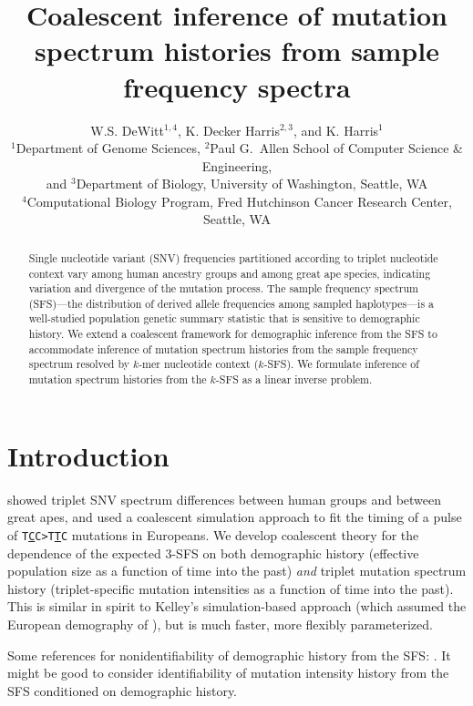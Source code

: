 \documentclass[11pt]{article}
\title{Coalescent inference of mutation spectrum histories from sample frequency spectra}
\author{
W.S. DeWitt$^{1,4}$, K. Decker Harris$^{2,3}$, and K. Harris$^{1}$\\
{\small
$^1$Department of Genome Sciences,
$^2$Paul G.\ Allen School of Computer Science \& Engineering,}\\
{\small and $^3$Department of Biology, University of Washington, Seattle, WA}\\
{\small $^4$Computational Biology Program, Fred Hutchinson Cancer Research Center, Seattle, WA}
}
\begin{document}
\maketitle

\begin{abstract}

Single nucleotide variant (SNV) frequencies partitioned according to triplet nucleotide context vary among human ancestry groups and among great ape species, indicating variation and divergence of the mutation process.
The sample frequency spectrum (SFS)---the distribution of derived allele frequencies among sampled haplotypes---is a well-studied population genetic summary statistic that is sensitive to demographic history.
We extend a coalescent framework for demographic inference from the SFS to accommodate inference of mutation spectrum histories from the sample frequency spectrum resolved by $k$-mer nucleotide context ($k$-SFS).
We formulate inference of mutation spectrum histories from the $k$-SFS as a linear inverse problem.

\end{abstract}


\section*{Introduction}\label{sec:intro}

\cite{Harris2017-fw} showed triplet SNV spectrum differences between human groups and between great apes, and used a coalescent simulation approach to fit the timing of a pulse of \texttt{T\underline{C}C>T\underline{T}C} mutations in Europeans.
We develop coalescent theory for the dependence of the expected 3-SFS on both demographic history (effective population size as a function of time into the past) \emph{and} triplet mutation spectrum history (triplet-specific mutation intensities as a function of time into the past).
This is similar in spirit to Kelley's simulation-based approach (which assumed the European demography of \cite{Tennessen2012-dq}), but is much faster, more flexibly parameterized.

Some references for nonidentifiability of demographic history from the SFS: \cite{Baharian2018-np, Bhaskar2014-fu, Terhorst2015-xt, Myers2008-jp}.
It might be good to consider identifiability of mutation intensity history from the SFS conditioned on demographic history.

\end{document}
